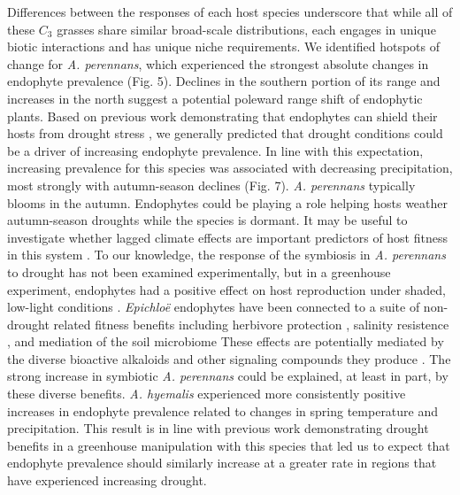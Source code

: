 \documentclass[11pt]{article}
\let\cite\citep
\begin{document}
Differences between the responses of each host species underscore that while all of these $C_3$ grasses share similar broad-scale distributions, each engages in unique biotic interactions and has unique niche requirements.
We identified hotspots of change for \emph{A. perennans}, which experienced the strongest absolute changes in endophyte prevalence (Fig. 5).
Declines in the southern portion of its range and increases in the north suggest a potential poleward range shift of endophytic plants. 
Based on previous work demonstrating that endophytes can shield their hosts from drought stress \cite{decunta2021systematic}, we generally predicted that drought conditions could be a driver of increasing endophyte prevalence. 
In line with this expectation, increasing prevalence for this species was associated with decreasing precipitation, most strongly with autumn-season declines (Fig. 7). 
\emph{A. perennans} typically blooms in the autumn.
Endophytes could be playing a role helping hosts weather autumn-season droughts while the species is dormant. 
It may be useful to investigate whether lagged climate effects are important predictors of host fitness in this system \cite{evers2021lagged}. 
To our knowledge, the response of the symbiosis in \emph{A. perennans} to drought has not been examined experimentally, but in a greenhouse experiment, endophytes had a positive effect on host reproduction under shaded, low-light conditions \citep{davitt2010costs}. 
\emph{Epichloë} endophytes have been connected to a suite of non-drought related fitness benefits including herbivore protection \citep{brem2001epichloe}, salinity resistence \citep{wang2020effects}, and mediation of the soil microbiome \citep{roberts2015rhizosphere} 
These effects are potentially mediated by the diverse bioactive alkaloids and other signaling compounds they produce \citep{saikkonen2013chemical}.
The strong increase in symbiotic \emph{A. perennans} could be explained, at least in part, by these diverse benefits. 
\emph{A. hyemalis} experienced more consistently positive increases in endophyte prevalence related to changes in spring temperature and precipitation.  
This result is in line with previous work demonstrating drought benefits in a greenhouse manipulation with this species \citep{davitt2011understanding} that led us to expect  that endophyte prevalence should similarly increase at a greater rate in regions that have experienced increasing drought.
\end{document}
